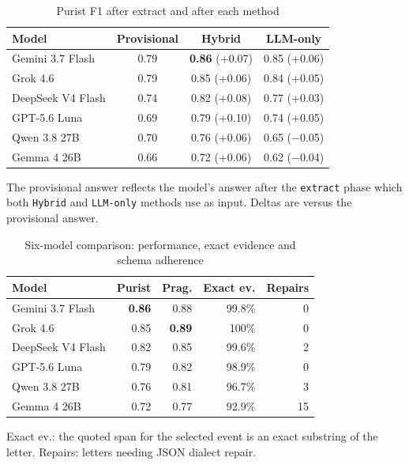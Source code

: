 \documentclass[conference]{IEEEtran}
\begin{document}
\begin{table}[!t]
\caption{Purist F1 after extract and after each method}
\label{tab:methods}
\centering
\footnotesize
\begin{tabularx}{\linewidth}{YCCC}
\toprule
\textbf{Model} & \textbf{Provisional} & \textbf{Hybrid} & \textbf{LLM-only} \\
\midrule
Gemini 3.7 Flash & 0.79 & \textbf{0.86} (+0.07) & 0.85 (+0.06) \\
Grok 4.6 & 0.79 & 0.85 (+0.06) & 0.84 (+0.05) \\
DeepSeek V4 Flash & 0.74 & 0.82 (+0.08) & 0.77 (+0.03) \\
GPT-5.6 Luna & 0.69 & 0.79 (+0.10) & 0.74 (+0.05) \\
Qwen 3.8 27B & 0.70 & 0.76 (+0.06) & 0.65 ($-$0.05) \\
Gemma 4 26B & 0.66 & 0.72 (+0.06) & 0.62 ($-$0.04) \\
\bottomrule
\end{tabularx}

\vspace*{2pt}
\begin{minipage}{\linewidth}
\raggedright\footnotesize
The provisional answer reflects the model's answer after the \texttt{extract} phase which both \texttt{Hybrid} and \texttt{LLM-only} methods use as input. Deltas are versus the provisional answer.  \end{minipage}
\end{table}

\begin{table}[!t]
\caption{Six-model comparison: performance, exact evidence and schema adherence}
\label{tab:adherence}
\centering
\footnotesize
\begin{tabularx}{\linewidth}{Yrrrr}
\toprule
\textbf{Model} & \textbf{Purist} & \textbf{Prag.} & \textbf{Exact ev.} & \textbf{Repairs} \\
\midrule
Gemini 3.7 Flash & \textbf{0.86} & 0.88 & 99.8\% & 0 \\
Grok 4.6 & 0.85 & \textbf{0.89} & 100\% & 0 \\
DeepSeek V4 Flash & 0.82 & 0.85 & 99.6\% & 2 \\
GPT-5.6 Luna & 0.79 & 0.82 & 98.9\% & 0 \\
Qwen 3.8 27B & 0.76 & 0.81 & 96.7\% & 3 \\
Gemma 4 26B & 0.72 & 0.77 & 92.9\% & 15 \\
\bottomrule
\end{tabularx}

\vspace*{2pt}
\begin{minipage}{\linewidth}
\raggedright\footnotesize
Exact ev.: the quoted span for the selected event is an exact substring of the letter. Repairs: letters needing JSON dialect repair.
\end{minipage}
\end{table}
\end{document}
